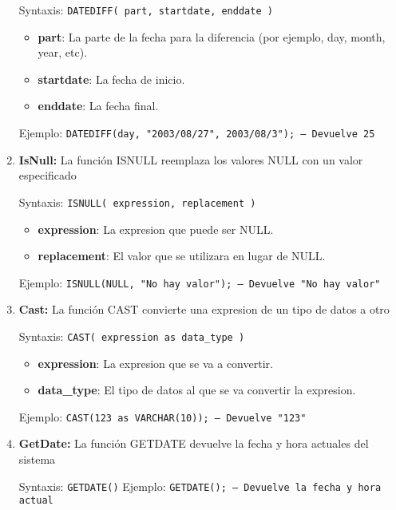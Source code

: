 \documentclass[a4paper,openany,11pt]{article}
\newcommand\skiplines[1]{\vspace{#1\baselineskip}}
\begin{document}
\begin{enumerate}
        Syntaxis: \texttt{DATEDIFF( part, startdate, enddate )}
        \begin{itemize}
            \item \textbf{part}: La parte de la fecha para la diferencia (por
                ejemplo, day, month, year, etc).
            \item \textbf{startdate}: La fecha de inicio.
            \item \textbf{enddate}: La fecha final.
        \end{itemize}

        Ejemplo: \texttt{DATEDIFF(day, "2003/08/27", 2003/08/3"); -- Devuelve 25}

    \skiplines{1}
    \item \textbf{IsNull:}
        La función ISNULL reemplaza los valores NULL con un valor especificado

        Syntaxis: \texttt{ISNULL( expression, replacement )}
        \begin{itemize}
            \item \textbf{expression}: La expresion que puede ser NULL.
            \item \textbf{replacement}: El valor que se utilizara en lugar de NULL.
        \end{itemize}

        Ejemplo: \texttt{ISNULL(NULL, "No hay valor"); -- Devuelve "No hay valor"}

    \skiplines{1}
    \item \textbf{Cast:}
        La función CAST convierte una expresion de un tipo de datos a otro

        Syntaxis: \texttt{CAST( expression as data_type )}
        \begin{itemize}
            \item \textbf{expression}: La expresion que se va a convertir.
            \item \textbf{data\_type}: El tipo de datos al que se va convertir
                la expresion.
        \end{itemize}

        Ejemplo: \texttt{CAST(123 as VARCHAR(10)); -- Devuelve "123"}

    \skiplines{1}
    \item \textbf{GetDate:}
        La función GETDATE devuelve la fecha y hora actuales del sistema

        Syntaxis: \texttt{GETDATE()}
        Ejemplo: \texttt{GETDATE(); -- Devuelve la fecha y hora actual}


\end{enumerate}
\end{document}
